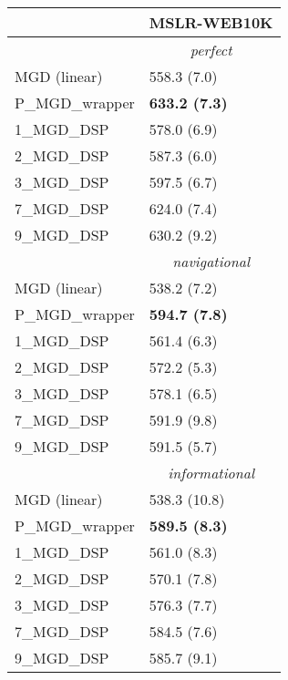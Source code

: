 \begin{tabular*}{\textwidth}{@{\extracolsep{\fill} } l  l  }
\toprule
 & { \small \textbf{MSLR-WEB10K}} \\
\midrule
& \multicolumn{1}{|c|}{\textit{perfect}} \\
\midrule
MGD (linear) & 558.3 {\tiny (7.0)} \\
P\_MGD\_wrapper & \bf 633.2 {\tiny (7.3)} \\
1\_MGD\_DSP & 578.0 {\tiny (6.9)} \\
2\_MGD\_DSP & 587.3 {\tiny (6.0)} \\
3\_MGD\_DSP & 597.5 {\tiny (6.7)} \\
7\_MGD\_DSP & 624.0 {\tiny (7.4)} \\
9\_MGD\_DSP & 630.2 {\tiny (9.2)} \\
\midrule
& \multicolumn{1}{|c|}{\textit{navigational}} \\
\midrule
MGD (linear) & 538.2 {\tiny (7.2)} \\
P\_MGD\_wrapper & \bf 594.7 {\tiny (7.8)} \\
1\_MGD\_DSP & 561.4 {\tiny (6.3)} \\
2\_MGD\_DSP & 572.2 {\tiny (5.3)} \\
3\_MGD\_DSP & 578.1 {\tiny (6.5)} \\
7\_MGD\_DSP & 591.9 {\tiny (9.8)} \\
9\_MGD\_DSP & 591.5 {\tiny (5.7)} \\
\midrule
& \multicolumn{1}{|c|}{\textit{informational}} \\
\midrule
MGD (linear) & 538.3 {\tiny (10.8)} \\
P\_MGD\_wrapper & \bf 589.5 {\tiny (8.3)} \\
1\_MGD\_DSP & 561.0 {\tiny (8.3)} \\
2\_MGD\_DSP & 570.1 {\tiny (7.8)} \\
3\_MGD\_DSP & 576.3 {\tiny (7.7)} \\
7\_MGD\_DSP & 584.5 {\tiny (7.6)} \\
9\_MGD\_DSP & 585.7 {\tiny (9.1)} \\
\bottomrule
\end{tabular*}
